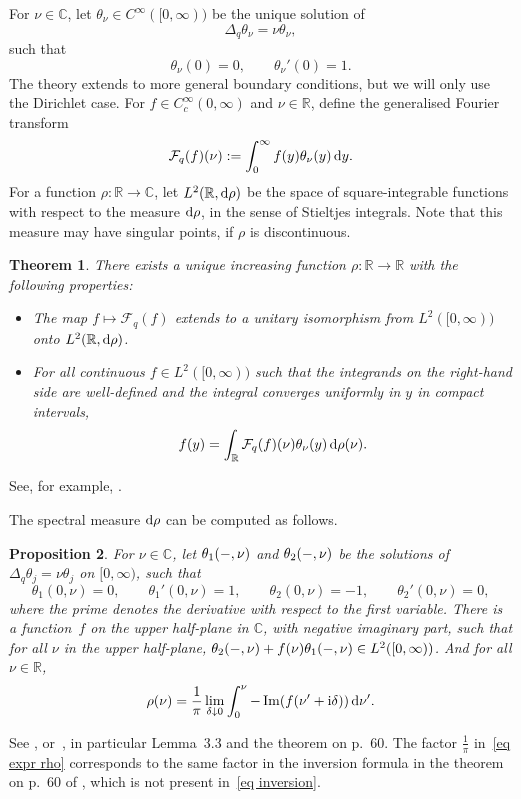 \documentclass[pdftex]{sigma}%
\numberwithin{equation}{section}
\newtheorem{Theorem}{Theorem}[section]
\newtheorem{Proposition}[Theorem]{Proposition}
 { \theoremstyle{definition}
\newtheorem{Definition}[Theorem]{Definition}
\newtheorem{Note}[Theorem]{Note}
\newtheorem{Example}[Theorem]{Example}
\newtheorem{Remark}[Theorem]{Remark} }
\DeclareMathOperator{\Imag}{Im}
\newcommand{\R}{\mathbb{R}}
\newcommand{\C}{\mathbb{C}}
\newcommand{\cF}{\mathcal{F}}
\begin{document}
For $\nu \in \C$, let $\theta_{\nu} \in C^{\infty}([0,\infty))$ be the unique solution of
\[
\Delta_{q}\theta_{\nu} = \nu \theta_{\nu},
\]
such that
\begin{equation} \label{eq Dirichlet}
\theta_{\nu}(0) = 0, \qquad
\theta_{\nu}'(0) = 1.
\end{equation}
The theory extends to more general boundary conditions, but we will only use the Dirichlet case. For $f \in C^{\infty}_c(0,\infty)$ and $\nu \in \R$, define the generalised Fourier transform
\[
\cF_q(f)(\nu):= \int_0^{\infty} f(y) \theta_{\nu} (y)\, {\rm d}y.
\]
 For a function $\rho\colon \R \to \C$, let $L^2(\R, {\rm d}\rho)$ be the space of square-integrable functions with respect to the measure ${\rm d}\rho$, in the sense of Stieltjes integrals. Note that this measure may have singular points, if $\rho$ is discontinuous.
 \begin{Theorem}\label{thm spec decomp}
 There exists a unique increasing function $\rho\colon \R \to \R$ with the following prop\-erties:
 \begin{itemize}\itemsep=0pt
 \item[$(a)$]
 The map $f \mapsto \cF_q(f)$ extends to a unitary isomorphism from $L^2([0,\infty))$ onto $L^2(\R, {\rm d}\rho)$.
 \item[$(b)$]
 For all continuous $f \in L^2([0,\infty))$ such that the integrands on the right-hand side are well-defined and the integral converges uniformly in $y$ in compact intervals,
 \begin{equation} \label{eq inversion}
 f(y) = \int_{\R} \cF_q(f)(\nu) \theta_{\nu}(y)\,{\rm d}\rho(\nu).
 \end{equation}
 \end{itemize}
 \end{Theorem}
 See, for example, \cite[Theorems~2.1.1 and 2.1.2]{Levitan91}.

The spectral measure ${\rm d}\rho$ can be computed as follows.
\begin{Proposition}\label{prop rho Titch}
For $\nu \in \C$,
let $\theta_1( \relbar, \nu)$ and $\theta_2( \relbar, \nu)$ be the solutions of $\Delta_{q}\theta_j = \nu \theta_j$ on $[0, \infty)$, such that
\[
\theta_1(0,\nu) = 0,\qquad
\theta_1'(0,\nu) = 1,\qquad
\theta_2(0,\nu) = -1,\qquad
\theta_2'(0,\nu)= 0,
\]
where the prime denotes the derivative with respect to the first variable. There is a function~$f$ on the upper half-plane in $\C$, with negative imaginary part, such that for all $\nu$ in the upper half-plane, $\theta_2(\relbar, \nu)+ f(\nu) \theta_1(\relbar, \nu) \in L^2([0,\infty))$. And for all $\nu \in \R$,
\begin{equation} \label{eq expr rho}
\rho(\nu) = \frac{1}{\pi} \lim_{\delta \downarrow 0} \int_0^{\nu} -\Imag(f(\nu'+{\rm i}\delta))\, {\rm d}\nu'.
\end{equation}
\end{Proposition}
See \cite[Theorem~2.4.1]{Levitan91}, or~\cite[Chapter~3]{Titchmarsh62}, in particular
 Lemma~3.3 and the theorem on p.~60. The factor $\frac{1}{\pi}$ in~\eqref{eq expr rho} corresponds to the same factor in the inversion formula in the theorem on p.~60 of \cite{Titchmarsh62}, which is not present in~\eqref{eq inversion}.
\end{document}
